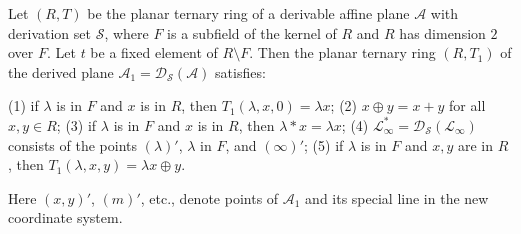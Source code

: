 Let $(R,T)$ be the planar ternary ring of a derivable affine plane $\mathcal{A}$ with derivation set $\mathcal{S}$, where $F$ is a subfield of the kernel of $R$ and $R$ has dimension $2$ over $F$. Let $t$ be a fixed element of $R \setminus F$. Then the planar ternary ring $(R,T_1)$ of the derived plane $\mathcal{A}_1 = \mathcal{D}_{\mathcal{S}}(\mathcal{A})$ satisfies:

(1) if $\lambda$ is in $F$ and $x$ is in $R$, then $T_1(\lambda, x, 0) = \lambda x$;
(2) $x \oplus y = x + y$ for all $x, y \in R$;
(3) if $\lambda$ is in $F$ and $x$ is in $R$, then $\lambda * x = \lambda x$;
(4) $\mathcal{L}_{\infty}^* = \mathcal{D}_{\mathcal{S}}(\mathcal{L}_{\infty})$ consists of the points $(\lambda)'$, $\lambda$ in $F$, and $(\infty)'$;
(5) if $\lambda$ is in $F$ and $x,y$ are in $R$, then $T_1(\lambda, x, y) = \lambda x \oplus y$.

Here $(x,y)'$, $(m)'$, etc., denote points of $\mathcal{A}_1$ and its special line in the new coordinate system.
